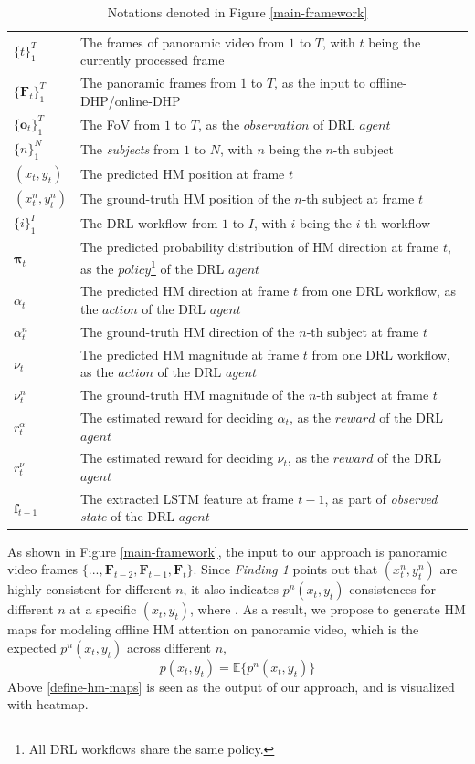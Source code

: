 \documentclass[10pt,journal,compsoc]{IEEEtran}
\begin{document}
\begin{table}
\center
\caption{Notations denoted in Figure \ref{main-framework}} \label{notation_framework}
\begin{tabular}{ll}
$\{t\}_{1}^{T}$ & The frames of panoramic video from $1$ to $T$, with $t$ being the currently processed frame \\
$\{\mathbf{F}_t\}_1^{T}$ & The panoramic frames from $1$ to $T$, as the input to offline-DHP/online-DHP\\
$\{\mathbf{o}_t\}_1^{T}$ & The FoV from $1$ to $T$, as the $observation$ of DRL $agent$ \\
$\{n\}_{1}^{N}$ & The \textit{subjects} from $1$ to $N$, with $n$ being the $n$-th subject\\
$(x_t, y_t)$ & The predicted HM position at frame $t$ \\
$(x^n_t, y^n_t)$ & The ground-truth HM position of the $n$-th subject at frame $t$ \\
$\{i\}_{1}^{I}$ & The DRL workflow from $1$ to $I$, with $i$ being the $i$-th workflow \\
$\mathbf{\pi}_t$ & The predicted probability distribution of HM direction at frame $t$, as the $policy$\footnote{All DRL workflows share the same policy.} of the DRL $agent$ \\
$\alpha_t$ & The predicted HM direction at frame $t$ from one DRL workflow, as the $action$ of the DRL $agent$ \\
$\alpha^n_t$ & The ground-truth HM direction of the $n$-th subject at frame $t$ \\
$\nu_t$ & The predicted HM magnitude at frame $t$ from one DRL workflow, as the $action$ of the DRL $agent$ \\
$\nu^n_t$ & The ground-truth HM magnitude of the $n$-th subject at frame $t$ \\
$r^{\alpha}_t$ & The estimated reward for deciding $\alpha_t$, as the $reward$ of the DRL $agent$ \\
$r^{\nu}_t$ & The estimated reward for deciding $\nu_t$, as the $reward$ of the DRL $agent$ \\
$\mathbf{f}_{t-1}$ & The extracted LSTM feature \cite{hausknecht2015deep} at frame $t-1$,  as part of \textit{observed state} of the DRL $agent$ \\

\end{tabular}
\end{table}

As shown in Figure \ref{main-framework}, the input to our approach is panoramic video frames $\{..., \mathbf{F}_{t-2}, \mathbf{F}_{t-1}, \mathbf{F}_{t}\}$.
Since \textit{Finding 1} points out that $(x^n_t, y^n_t)$ are highly consistent for different $n$, it also indicates $p^n(x_t,y_t)$ consistences for different $n$ at a specific $(x_t,y_t)$, where . As a result, we propose to generate HM maps for modeling offline HM attention on panoramic video, which is the expected $p^n(x_t,y_t)$ across different $n$,
 \begin{equation}\label{define-hm-maps}
   p(x_t,y_t) = \mathbb{E}\{ p^n(x_t, y_t) \}
 \end{equation}
 Above \eqref{define-hm-maps} is seen as the output of our approach, and is visualized with heatmap.
\end{document}
